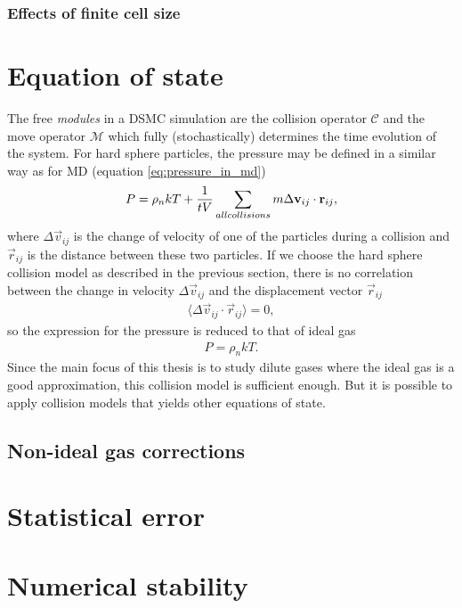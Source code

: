 \subsubsection{Effects of finite cell size}



\section{Equation of state}
\label{sec:dsmc_eos}
The free \textit{modules} in a DSMC simulation are the collision operator $\mathcal C$ and the move operator $\mathcal M$ which fully (stochastically) determines the time evolution of the system. For hard sphere particles, the pressure may be defined in a similar way as for MD (equation \eqref{eq:pressure_in_md})
\begin{align}
	P = \rho_nkT + {1\over tV}\sum_{all collisions} m\Delta \vec v_{ij}\cdot \vec r_{ij},
\end{align}
where $\Delta \vec v_{ij}$ is the change of velocity of one of the particles during a collision and $\vec r_{ij}$ is the distance between these two particles\cite{garcia1997direct}. If we choose the hard sphere collision model as described in the previous section, there is no correlation between the change in velocity $\Delta \vec v_{ij}$ and the displacement vector $\vec r_{ij}$
\begin{align}
	\langle \Delta \vec v_{ij}\cdot \vec r_{ij}\rangle = 0,
\end{align}
so the expression for the pressure is reduced to that of ideal gas
\begin{align}
	P = \rho_n kT.
\end{align}
Since the main focus of this thesis is to study dilute gases where the ideal gas is a good approximation, this collision model is sufficient enough. But it is possible to apply collision models that yields other equations of state.
\subsection{Non-ideal gas corrections}
\section{Statistical error}
\section{Numerical stability}